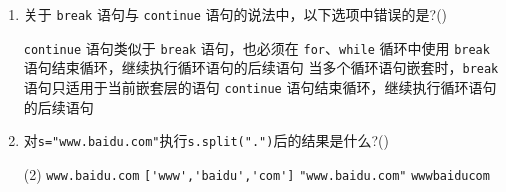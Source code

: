 \documentclass[11pt]{ctexart}
\begin{document}
\begin{enumerate}
        \item 关于 \lstinline{break} 语句与 \lstinline{continue} 语句的说法中，以下选项中错误的是?(\qquad)
        \begin{tasks}
            \task \lstinline{continue} 语句类似于 \lstinline{break} 语句，也必须在 \lstinline{for}、\lstinline{while} 循环中使用
            \task \lstinline{break} 语句结束循环，继续执行循环语句的后续语句
            \task 当多个循环语句嵌套时，\lstinline{break} 语句只适用于当前嵌套层的语句
            \task \lstinline{continue} 语句结束循环，继续执行循环语句的后续语句
        \end{tasks}

        \item 对\lstinline!s="www.baidu.com"!执行\lstinline!s.split(".")!后的结果是什么?(\qquad)
        \begin{tasks}(2)
            \task \lstinline!www.baidu.com!
            \task \lstinline!['www','baidu','com']!
            \task \lstinline!"www.baidu.com"!
            \task \lstinline!wwwbaiducom!
        \end{tasks}
    \end{enumerate}
\end{document}
